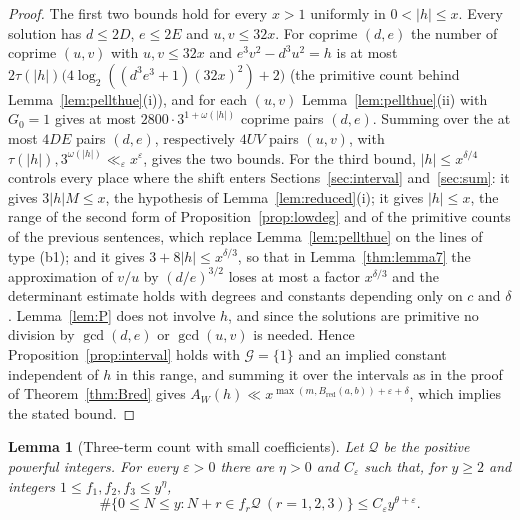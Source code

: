 \documentclass[11pt,reqno]{amsart}
\newtheorem{lemma}[theorem]{Lemma}
\theoremstyle{definition}
\theoremstyle{remark}
\numberwithin{equation}{section}
\newcommand{\Bred}{B_{\mathrm{red}}}
\begin{document}
\begin{proof}
The first two bounds hold for every $x>1$ uniformly in $0<|h|\le x$. Every
solution has $d\le2D$, $e\le2E$ and $u,v\le32x$. For coprime $(d,e)$ the
number of coprime $(u,v)$ with $u,v\le32x$ and $e^3v^2-d^3u^2=h$ is at most
$2\tau(|h|)\bigl(4\log_2((d^3e^3+1)(32x)^2)+2\bigr)$ (the primitive count
behind Lemma~\ref{lem:pellthue}(i)), and for each $(u,v)$
Lemma~\ref{lem:pellthue}(ii) with $G_0=1$ gives at most
$2800\cdot3^{1+\omega(|h|)}$ coprime pairs $(d,e)$. Summing over the at most
$4DE$ pairs $(d,e)$, respectively $4UV$ pairs $(u,v)$, with
$\tau(|h|),3^{\omega(|h|)}\ll_\varepsilon x^{\varepsilon}$, gives the two bounds.
For the third bound, $|h|\le x^{\delta/4}$ controls every place where the
shift enters Sections~\ref{sec:interval} and~\ref{sec:sum}:
it gives $3|h|M\le x$, the hypothesis of Lemma~\ref{lem:reduced}(i); it gives
$|h|\le x$, the range of the second form of Proposition~\ref{prop:lowdeg} and
of the primitive counts of the previous sentences, which replace
Lemma~\ref{lem:pellthue} on the lines of type (b1);
and it gives $3+8|h|\le x^{\delta/3}$, so that in Lemma~\ref{thm:lemma7} the
approximation of $v/u$ by $(d/e)^{3/2}$ loses at most a factor $x^{\delta/3}$
and the determinant estimate holds with degrees and constants depending only
on $c$ and $\delta$. Lemma~\ref{lem:P} does not involve $h$, and since the
solutions are primitive no division by $\gcd(d,e)$ or $\gcd(u,v)$ is needed.
Hence Proposition~\ref{prop:interval} holds with $\mathcal G=\{1\}$ and an
implied constant independent of $h$ in this range, and summing it over the
intervals as in the proof of Theorem~\ref{thm:Bred} gives
$A_W(h)\ll x^{\max(m,\Bred(a,b))+\varepsilon+\delta}$, which implies the
stated bound.
\end{proof}

\begin{lemma}[Three-term count with small coefficients]\label{lem:uniformtriple}
Let $\mathcal Q$ be the positive powerful integers. For every
$\varepsilon>0$ there are $\eta>0$ and $C_\varepsilon$ such that, for
$y\ge2$ and integers $1\le f_1,f_2,f_3\le y^\eta$,
\[
 \#\{0\le N\le y:N+r\in f_r\mathcal Q\ (r=1,2,3)\}
 \le C_\varepsilon y^{\theta+\varepsilon}.
\]
\end{lemma}
\end{document}
